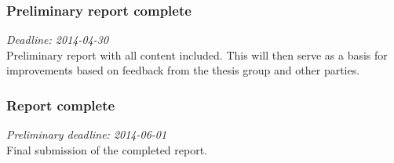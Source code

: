 \documentclass[a4paper,11pt]{article}
\begin{document}
\subsubsection*{Preliminary report complete}
\noindent
\emph{Deadline: 2014-04-30}\\
\noindent
Preliminary report with all content included.
This will then serve as a basis for improvements based on feedback from the thesis group and other parties.

\subsubsection*{Report complete}
\noindent
\emph{Preliminary deadline: 2014-06-01}\\
\noindent
Final submission of the completed report.
\end{document}
